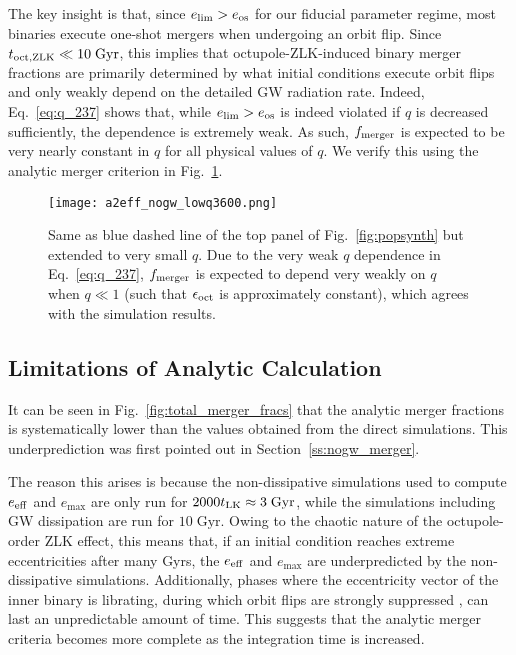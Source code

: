\documentclass[
        fleqn,
        usenatbib,
    ]{mnras}
\newlength{\colummwidth}
\begin{document}
The key insight is that, since $e_{\lim} > e_{\rm os}$ for our fiducial
parameter regime, most binaries execute one-shot mergers when undergoing an
orbit flip. Since $t_{\rm oct, ZLK} \ll 10\;\mathrm{Gyr}$, this implies that
octupole-ZLK-induced binary merger fractions are primarily determined by what
initial conditions execute orbit flips and only weakly depend on the detailed GW
radiation rate. Indeed, Eq.~\eqref{eq:q_237} shows that, while $e_{\lim} >
e_{\rm os}$ is indeed violated if $q$ is decreased sufficiently, the dependence
is extremely weak. As such, $f_{\rm merger}$ is expected to be very nearly
constant in $q$ for all physical values of $q$. We verify this using the
analytic merger criterion in Fig.~\ref{fig:popsynth_lowq}.
\begin{figure}
    \centering
    \texttt{[image: a2eff\_nogw\_lowq3600.png]}
    \caption{Same as blue dashed line of the top panel of
    Fig.~\ref{fig:popsynth} but extended to very small $q$. Due to the very weak
    $q$ dependence in Eq.~\eqref{eq:q_237}, $f_{\rm merger}$ is expected to
    depend very weakly on $q$ when $q \ll 1$ (such that $\epsilon_{\rm oct}$ is
    approximately constant), which agrees with the simulation
    results.}\label{fig:popsynth_lowq}
\end{figure}

\subsection{Limitations of Analytic Calculation}\label{ss:completeness}

It can be seen in Fig.~\ref{fig:total_merger_fracs}
that the analytic merger fractions is systematically lower than the values
obtained from the direct simulations. This underprediction was first pointed out
in Section~\ref{ss:nogw_merger}.

The reason this arises is because the non-dissipative simulations used to
compute $e_{\rm eff}$ and $e_{\max}$ are only run for $2000 t_{\rm LK} \approx
3\;\mathrm{Gyr}$, while the simulations including GW dissipation are run for
$10\;\mathrm{Gyr}$. Owing to the chaotic nature of the octupole-order ZLK
effect, this means that, if an initial condition reaches extreme eccentricities
after many Gyrs, the $e_{\rm eff}$ and $e_{\max}$ are underpredicted by the
non-dissipative simulations. Additionally, phases where the eccentricity vector
of the inner binary is librating, during which orbit flips are strongly
suppressed \citep{katz2011long}, can last an unpredictable amount of time. This
suggests that the analytic merger criteria becomes more complete as the
integration time is increased.
\end{document}
